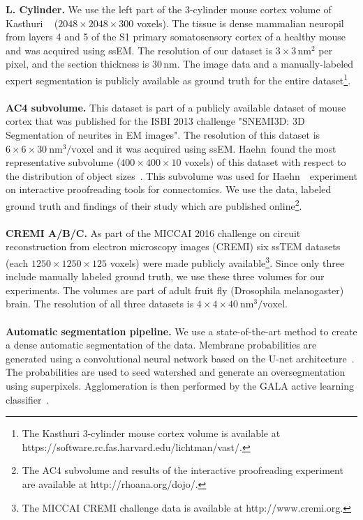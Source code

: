 \textbf{L. Cylinder.} We use the left part of the 3-cylinder mouse cortex volume of Kasthuri \etal~\cite{kasthuri2015saturated} ($2048\times2048\times300$ voxels). The tissue is dense mammalian neuropil from layers 4 and 5 of the S1 primary somatosensory cortex of a healthy mouse and was acquired using ssEM. The resolution of our dataset is $3\times3\, \text{nm}^2$ per pixel, and the section thickness is $30\, \text{nm}$. The image data and a manually-labeled expert segmentation is publicly available as ground truth for the entire dataset\footnote{The Kasthuri 3-cylinder mouse cortex volume is available at  https://software.rc.fas.harvard.edu/lichtman/vast/.}.
\\~\\
\textbf{AC4 subvolume.} This dataset is part of a publicly available dataset of mouse cortex that was published for the ISBI 2013 challenge "SNEMI3D: 3D Segmentation of neurites in EM images". The resolution of this dataset is $6\times6\times30~\text{nm}^3\text{/voxel}$ and it was acquired using ssEM. Haehn~\etal found the most representative subvolume ($400\times400\times10$ voxels) of this dataset with respect to the distribution of object sizes~\cite{haehn_dojo_2014}. This subvolume was used for Haehn~\etal~experiment on interactive proofreading tools for connectomics. We use the data, labeled ground truth and findings of their study which are published online\footnote{The AC4 subvolume and results of the interactive proofreading experiment are available at http://rhoana.org/dojo/.}. 
\\~\\
\textbf{CREMI A/B/C.} As part of the MICCAI 2016 challenge on circuit reconstruction from electron microscopy images (CREMI) six ssTEM datasets (each $1250\times1250\times125$ voxels) were made publicly available\footnote{The MICCAI CREMI challenge data is available at http://www.cremi.org.}. Since only three include manually labeled ground truth, we use these three volumes for our experiments. The volumes are part of adult fruit fly (Drosophila melanogaster) brain. The resolution of all three datasets is $4\times4\times40~\text{nm}^3\text{/voxel}$. 
\\~\\
\textbf{Automatic segmentation pipeline.}
We use a state-of-the-art method to create a dense automatic segmentation of the data. Membrane probabilities are generated using a convolutional neural network based on the U-net architecture~\cite{RonnebergerFB15}. The probabilities are used to seed watershed and generate an oversegmentation using superpixels. Agglomeration is then performed by the GALA active learning classifier~\cite{nunez2014graph}.

